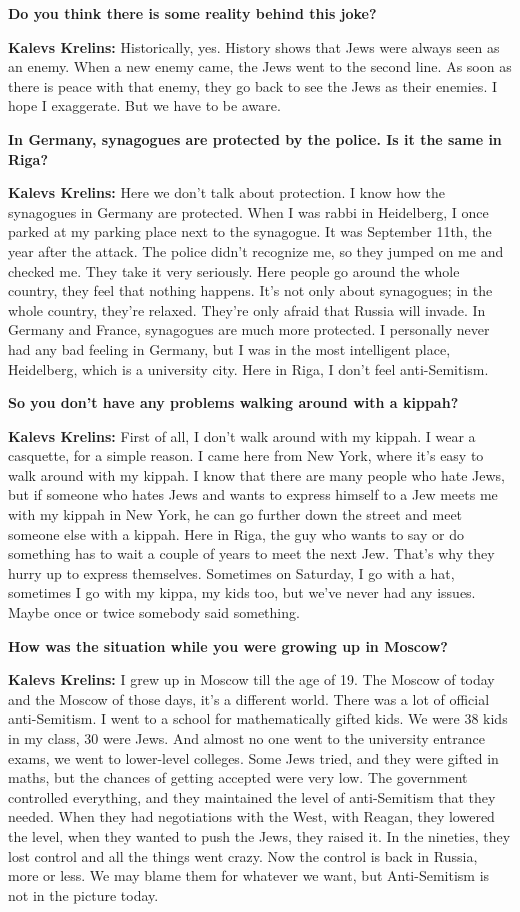 \textbf{Do you think there is some reality behind this joke?}  

\textbf{Kalevs Krelins:} Historically, yes. History shows that Jews were always seen as an enemy. When a new enemy came, the Jews went to the second line. As soon as there is peace with that enemy, they go back to see the Jews as their enemies. I hope I exaggerate. But we have to be aware. 

\textbf{In Germany, synagogues are protected by the police. Is it the same in Riga?} 

\textbf{Kalevs Krelins:} Here we don’t talk about protection. I know how the synagogues in Germany are protected. When I was rabbi in Heidelberg, I once parked at my parking place next to the synagogue. It was September 11th, the year after the attack. The police didn’t recognize me, so they jumped on me and checked me. They take it very seriously. Here people go around the whole country, they feel that nothing happens. It’s not only about synagogues; in the whole country, they're relaxed. They’re only afraid that Russia will invade. In Germany and France, synagogues are much more protected. I personally never had any bad feeling in Germany, but I was in the most intelligent place, Heidelberg, which is a university city. Here in Riga, I don’t feel anti-Semitism.  

\textbf{So you don’t have any problems walking around with a kippah?} 

\textbf{Kalevs Krelins:} First of all, I don't walk around with my kippah. I wear a casquette, for a simple reason. I came here from New York, where it’s easy to walk around with my kippah. I know that there are many people who hate Jews, but if someone who hates Jews and wants to express himself to a Jew meets me with my kippah in New York, he can go further down the street and meet someone else with a kippah. Here in Riga, the guy who wants to say or do something has to wait a couple of years to meet the next Jew. That’s why they hurry up to express themselves. Sometimes on Saturday, I go with a hat, sometimes I go with my kippa, my kids too, but we've never had any issues. Maybe once or twice somebody said something. 

\textbf{How was the situation while you were growing up in Moscow?} 

\textbf{Kalevs Krelins:} I grew up in Moscow till the age of 19. The Moscow of today and the Moscow of those days, it's a different world. There was a lot of official anti-Semitism. I went to a school for mathematically gifted kids. We were 38 kids in my class, 30 were Jews. And almost no one went to the university entrance exams, we went to lower-level colleges. Some Jews tried, and they were gifted in maths, but the chances of getting accepted were very low. The government controlled everything, and they maintained the level of anti-Semitism that they needed. When they had negotiations with the West, with Reagan, they lowered the level, when they wanted to push the Jews, they raised it. In the nineties, they lost control and all the things went crazy. Now the control is back in Russia, more or less. We may blame them for whatever we want, but Anti-Semitism is not in the picture today. 

